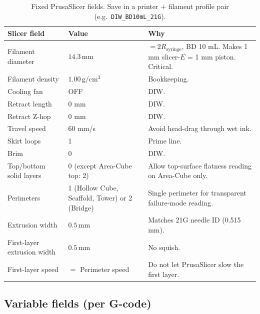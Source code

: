 \documentclass[11pt,a4paper]{article}
\begin{document}
\begin{table}[h]
\centering
\small
\begin{tabular}{p{5.2cm} p{3.4cm} p{6.2cm}}
\toprule
Slicer field & Value & Why \\
\midrule
Filament diameter & $\mathbf{14.3\,\mathrm{mm}}$ &
  $= 2 R_\mathrm{syringe}$, BD 10 mL. Makes 1 mm slicer-$E$ = 1 mm
  piston. Critical. \\
Filament density & $1.00\,\mathrm{g/cm^3}$ & Bookkeeping. \\
Cooling fan & OFF & DIW. \\
Retract length & 0 mm & DIW. \\
Retract Z-hop & 0 mm & DIW. \\
Travel speed & 60 mm/s & Avoid head-drag through wet ink. \\
Skirt loops & 1 & Prime line. \\
Brim & 0 & DIW. \\
Top/bottom solid layers & 0 (except Area-Cube top: 2) &
  Allow top-surface flatness reading on Area-Cube only. \\
Perimeters & 1 (Hollow Cube, Scaffold, Tower) or 2 (Bridge) &
  Single perimeter for transparent failure-mode reading. \\
Extrusion width & $\mathbf{0.5\,\mathrm{mm}}$ &
  Matches 21G needle ID (0.515 mm). \\
First-layer extrusion width & $0.5\,\mathrm{mm}$ & No squish. \\
First-layer speed & $=$ Perimeter speed &
  Do not let PrusaSlicer slow the first layer. \\
\bottomrule
\end{tabular}
\caption{Fixed PrusaSlicer fields. Save in a printer + filament
profile pair (e.g.\ \texttt{DIW\_BD10mL\_21G}).}
\label{tab:slicer_fixed}
\end{table}

\subsection{Variable fields (per G-code)}
\end{document}
